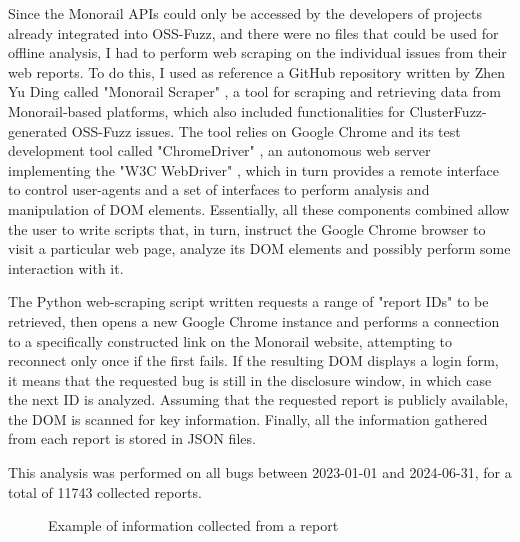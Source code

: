 Since the Monorail APIs could only be accessed by the developers of projects already integrated into OSS-Fuzz, and there were no files that could be used for offline analysis, I had to perform web scraping on the individual issues from their web reports. To do this, I used as reference a GitHub repository written by Zhen Yu Ding called "Monorail Scraper" \cite{scraper}, a tool for scraping and retrieving data from Monorail-based platforms, which also included functionalities for ClusterFuzz-generated OSS-Fuzz issues. The tool relies on Google Chrome and its test development tool called "ChromeDriver" \cite{driver}, an autonomous web server implementing the "W3C WebDriver" \cite{driver_standard}, which in turn provides a remote interface to control user-agents and a set of interfaces to perform analysis and manipulation of DOM elements. Essentially, all these components combined allow the user to write scripts that, in turn, instruct the Google Chrome browser to visit a particular web page, analyze its DOM elements and possibly perform some interaction with it.


\newpage
The Python web-scraping script written requests a range of "report IDs" to be retrieved, then opens a new Google Chrome instance and performs a connection to a specifically constructed link on the Monorail website, attempting to reconnect only once if the first fails. If the resulting DOM displays a login form, it means that the requested bug is still in the disclosure window, in which case the next ID is analyzed. Assuming that the requested report is publicly available, the DOM is scanned for key information. Finally, all the information gathered from each report is stored in JSON files. 

This analysis was performed on all bugs between 2023-01-01 and 2024-06-31, for a total of 11743 collected reports.

\begin{figure}[h]
\caption{Example of information collected from a report}
\label{fig:report}
\end{figure}


